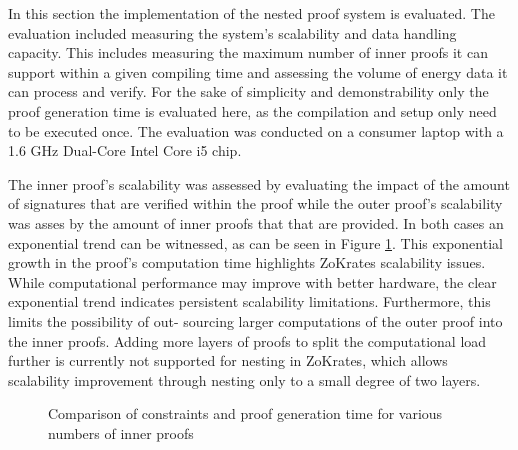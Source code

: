 In this section the implementation of the nested proof system is evaluated. The evaluation included measuring the system’s scalability and data handling capacity. This includes measuring the maximum number of inner proofs it can support within a given compiling time and assessing the volume of energy data it can process and verify. For the sake of simplicity and demonstrability only the proof generation time is evaluated here, as  the compilation and setup only need to be executed once.
The evaluation was conducted on a consumer laptop with a 1.6 GHz Dual-Core Intel Core i5 chip. 

The inner proof’s scalability was assessed by evaluating the impact of the amount of signatures that are verified within the proof while the outer proof's scalability was asses by the amount of inner proofs that that are provided. In both cases an exponential trend can be witnessed, as can be seen in Figure \ref{figure:number_of_innner}. This exponential growth in the proof’s computation time highlights ZoKrates scalability issues. While computational performance may improve with better hardware, the clear exponential trend indicates persistent scalability limitations. Furthermore, this limits the possibility of out- sourcing larger computations of the outer proof into the inner proofs. Adding more layers of proofs to split the computational load further is currently not supported for nesting in ZoKrates, which allows scalability improvement through nesting only to a small degree of two layers.

\begin{figure}[h]
\centering
{}

\caption{Comparison of constraints and proof generation time for various numbers of inner proofs}
\label{figure:number_of_innner}
\end{figure}

